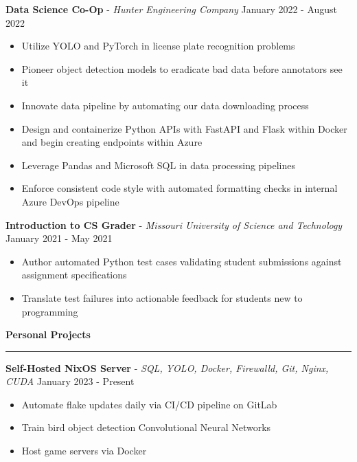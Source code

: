 \documentclass[11pt]{article}
\begin{document}

\textbf{Data Science Co-Op} - \textsl{Hunter Engineering Company} \hfill January 2022 - August 2022
\begin{itemize}[noitemsep, topsep=0pt, partopsep=0pt, parsep=0pt, itemsep=0pt]
    \small
    \item Utilize YOLO and PyTorch in license plate recognition problems
    \item Pioneer object detection models to eradicate bad data before annotators see it
    \item Innovate data pipeline by automating our data downloading process
    \item Design and containerize Python APIs with FastAPI and Flask within Docker and begin creating endpoints within Azure
    \item Leverage Pandas and Microsoft SQL in data processing pipelines
    \item Enforce consistent code style with automated formatting checks in internal Azure DevOps pipeline
\end{itemize}

\textbf{Introduction to CS Grader} - \textsl{Missouri University of Science and Technology} \hfill January 2021 - May 2021
\begin{itemize}[noitemsep, topsep=0pt, partopsep=0pt, parsep=0pt, itemsep=0pt]
    \small
    \item Author automated Python test cases validating student submissions against assignment specifications
    \item Translate test failures into actionable feedback for students new to programming
\end{itemize}


\vspace{1pt}  %
\textbf{Personal Projects}\par
\vspace{-12pt}
\noindent\rule{\textwidth}{0.4pt}

\textbf{Self-Hosted NixOS Server} - \textsl{SQL, YOLO, Docker, Firewalld, Git, Nginx, CUDA} \hfill January 2023 - Present
\begin{itemize}[noitemsep, topsep=0pt, partopsep=0pt, parsep=0pt, itemsep=0pt]
    \small
    \item Automate flake updates daily via CI/CD pipeline on GitLab
    \item Train bird object detection Convolutional Neural Networks
    \item Host game servers via Docker
\end{itemize}
\end{document}
